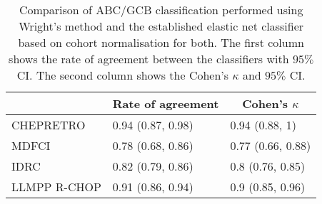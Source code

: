 \begin{table}[!tbp]
{\small
\caption{Comparison of ABC/GCB classification performed using Wright's
method and the established elastic net classifier based on cohort normalisation
for both. The first column shows the rate of agreement between the classifiers
with $95\%$ CI. The second column shows the Cohen's $\kappa$ and $95\%$ CI.\label{tab:ABCGCBclassifier}} 
\begin{center}
\begin{tabular}{lll}
\hline\hline
\multicolumn{1}{l}{}&\multicolumn{1}{c}{Rate of agreement}&\multicolumn{1}{c}{Cohen's $\kappa$}\tabularnewline
\hline
CHEPRETRO&0.94 (0.87, 0.98)&0.94 (0.88, 1)\tabularnewline
MDFCI&0.78 (0.68, 0.86)&0.77 (0.66, 0.88)\tabularnewline
IDRC&0.82 (0.79, 0.86)&0.8 (0.76, 0.85)\tabularnewline
LLMPP R-CHOP&0.91 (0.86, 0.94)&0.9 (0.85, 0.96)\tabularnewline
\hline
\end{tabular}\end{center}}

\end{table}
